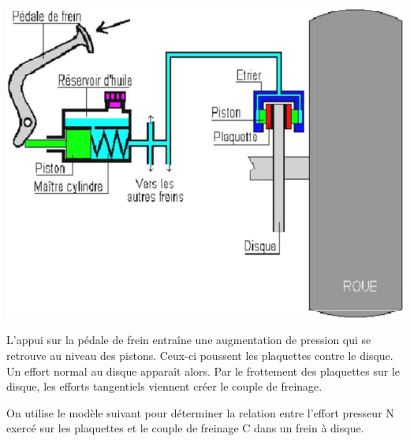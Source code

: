 \documentclass[10pt]{article}
\begin{document}
\begin{minipage}[c]{.4\linewidth}
\begin{center}
\includegraphics[width=.95\textwidth]{images/frein2}
\end{center}
\end{minipage} \hfill
\begin{minipage}[c]{.57\linewidth}
L'appui sur la pédale de frein entraîne une augmentation de pression qui se retrouve au niveau des pistons. Ceux-ci poussent les plaquettes contre le disque. Un effort normal au disque apparaît alors. Par le frottement des plaquettes sur le disque, les efforts tangentiels viennent créer le couple de freinage. 
\end{minipage}

On utilise le modèle suivant pour déterminer la relation entre l'effort presseur N exercé sur les plaquettes et le couple de freinage C dans un frein à disque. 
\end{document}
